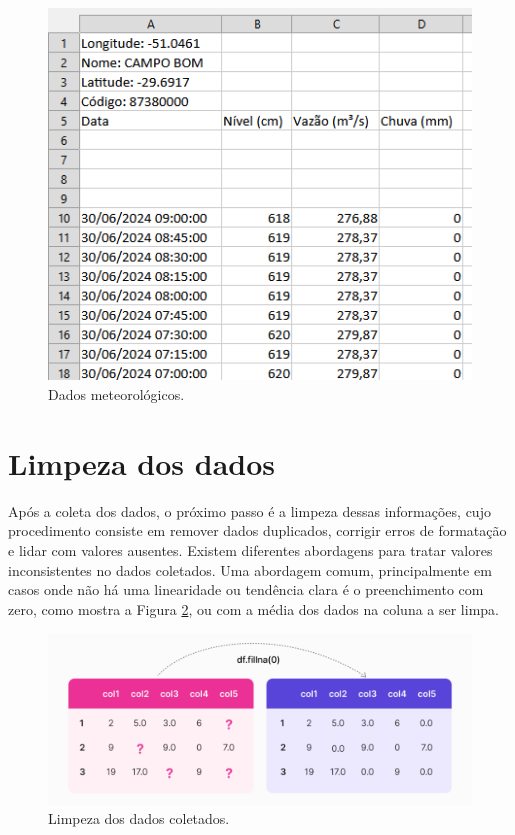\begin{figure}[H]
	\caption{\label{fig:base_sema}Dados meteorológicos.}
	\begin{center}
		\includegraphics[scale=0.5]{figuras/base_sema.png}
	\end{center}
\end{figure}

\section{Limpeza dos dados}
\label{sec:limpeza_dos_dados}

Após a coleta dos dados, o próximo passo é a limpeza dessas informações, cujo procedimento consiste em remover dados duplicados, corrigir erros de formatação e lidar com valores ausentes. Existem diferentes abordagens para tratar valores inconsistentes no dados coletados. Uma abordagem comum, principalmente em casos onde não há uma linearidade ou tendência clara é o preenchimento com zero, como mostra a Figura \ref{fig:passo_dados_limpeza}, ou com a média dos dados na coluna a ser limpa.

\begin{figure}[H]
	\caption{\label{fig:passo_dados_limpeza}Limpeza dos dados coletados.}
	\begin{center}
		\includegraphics[scale=0.4]{figuras/step_data_cleaning.png}
	\end{center}
\end{figure}

